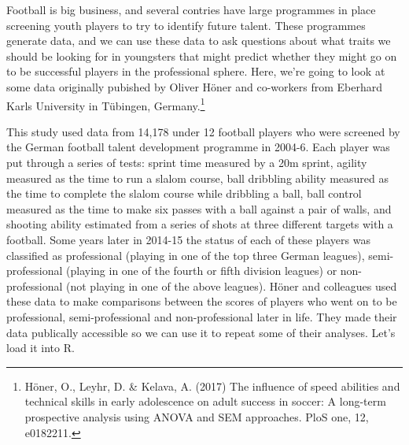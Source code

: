 \documentclass[
]{book}
\begin{document}
Football is big business, and several contries have large programmes in place screening youth players to try to identify future talent. These programmes generate data, and we can use these data to ask questions about what traits we should be looking for in youngsters that might predict whether they might go on to be successful players in the professional sphere. Here, we're going to look at some data originally pubished by Oliver Höner and co-workers from Eberhard Karls University in Tübingen, Germany.\footnote{Höner, O., Leyhr, D. \& Kelava, A. (2017) The influence of speed abilities and technical skills in early adolescence on adult success in soccer: A long-term prospective analysis using ANOVA and SEM approaches. PloS one, 12, e0182211.}

This study used data from 14,178 under 12 football players who were screened by the German football talent development programme in 2004-6. Each player was put through a series of tests: sprint time measured by a 20m sprint, agility measured as the time to run a slalom course, ball dribbling ability measured as the time to complete the slalom course while dribbling a ball, ball control measured as the time to make six passes with a ball against a pair of walls, and shooting ability estimated from a series of shots at three different targets with a football. Some years later in 2014-15 the status of each of these players was classified as professional (playing in one of the top three German leagues), semi-professional (playing in one of the fourth or fifth division leagues) or non-professional (not playing in one of the above leagues). Höner and colleagues used these data to make comparisons between the scores of players who went on to be professional, semi-professional and non-professional later in life. They made their data publically accessible so we can use it to repeat some of their analyses. Let's load it into R.
\end{document}
